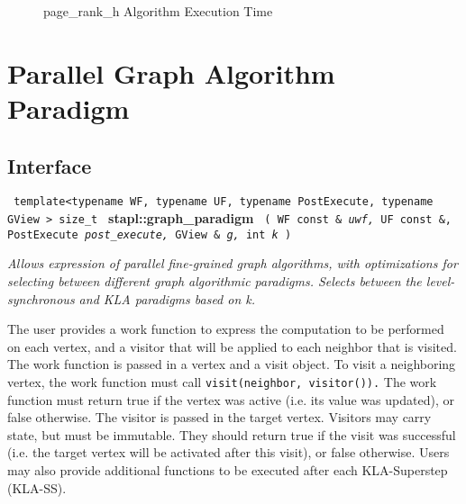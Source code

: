 \begin{figure}[p]
\caption{ page\_rank\_h Algorithm Execution Time}
\label{fig:page-rank-h-alg-exec-exper}
\end{figure}


\section{ Parallel Graph Algorithm Paradigm}
\label{sec-graf-para-alg}

\subsection{Interface} \label{sec-graf-para-alg-inter}

\noindent
\texttt{%
template<typename WF, typename UF, typename PostExecute, typename GView >
\newline
size\_t 
}
\newline
\textbf{stapl::graph\_paradigm}%
\newline
\texttt{%
(
WF const \&
\textit{uwf,}%
UF const \&,
PostExecute
\textit{post\_execute,}%
GView \&
\textit{g,}%
int
\textit{k}%
)     
}
\vspace{0.4cm}

\textit{
Allows expression of parallel fine-grained graph algorithms, with optimizations for selecting between different graph algorithmic paradigms.
Selects between the level-synchronous and KLA paradigms based on k.
}
\vspace{0.4cm}

The user provides a work function to express the computation to be performed on each vertex, and a visitor that will be applied to each neighbor that is visited. The work function is passed in a vertex and a visit object. To visit a neighboring vertex, the work function must call 
\texttt{visit(neighbor, visitor()).}
The work function must return true if the vertex was active (i.e. its value was updated), or false otherwise. The visitor is passed in the target vertex. Visitors may carry state, but must be immutable. They should return true if the visit was successful (i.e. the target vertex will be activated after this visit), or false otherwise. Users may also provide additional functions to be executed after each KLA-Superstep (KLA-SS).

